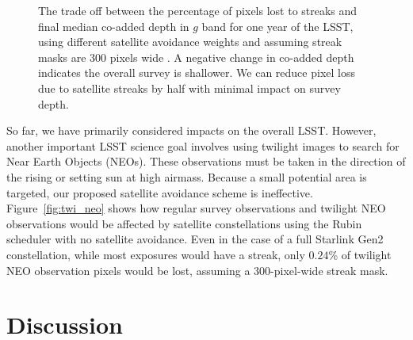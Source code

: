 \documentclass[twocolumn]{aastex631}
\begin{document}
\begin{figure}[ht!]
\caption{The trade off between the percentage of pixels lost to streaks and final median co-added depth in $g$ band for one year of the LSST, using different satellite avoidance weights and assuming streak masks are 300 pixels wide \citep{hasan22}. A negative change in co-added depth indicates the overall survey is shallower. We can reduce pixel loss due to satellite streaks by half with minimal impact on survey depth.
\label{fig-trade-off}}
\end{figure}

So far, we have primarily considered impacts on the overall LSST. However, another important LSST science goal involves using twilight images to search for Near Earth Objects (NEOs). These observations must be taken in the direction of the rising or setting sun at high airmass. Because a small potential area is targeted, our proposed satellite avoidance scheme is ineffective. Figure~\ref{fig:twi_neo} shows how regular survey observations and twilight NEO observations would be affected by satellite constellations using the Rubin scheduler with no satellite avoidance. Even in the case of a full Starlink Gen2 constellation, while most exposures would have a streak, only $0.24$\% of twilight NEO observation pixels would be lost, assuming a 300-pixel-wide streak mask.

\begin{figure*}
\centering
{}
\caption{Impacts of satellite streaks on simulated LSST observations without any satellite avoidance. Compared to standard LSST observations (top), twilight NEO observations (bottom) cannot easily be shifted to avoid satellites. The left panels show the altitude and azimuth distribution of observations on the sky, and the right panels show how many streaks would result from the three simulated satellite constellations as a function of how high above the horizon the telescope is pointing (observation altitude). While most twilight NEO observations would contain a satellite streak, pixel loss is still low.
\label{fig:twi_neo}}
\end{figure*}


\section{Discussion}\label{discuss}
\end{document}
